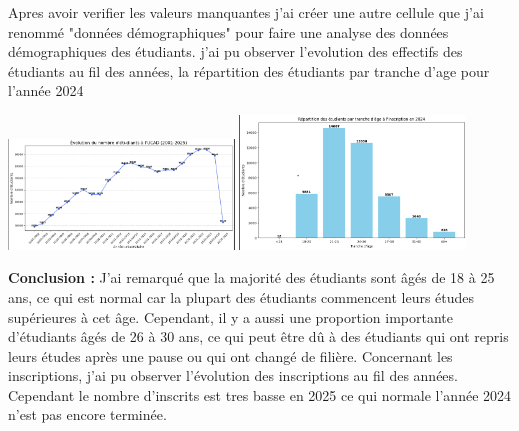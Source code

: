 Apres avoir verifier les valeurs manquantes j'ai créer une autre cellule que j'ai renommé "données démographiques"  pour faire une analyse des données démographiques des étudiants. 
j'ai pu observer l'evolution des effectifs des étudiants au fil des années, la répartition des étudiants par tranche d'age pour l'année 2024  
\begin{center}
    \centering
    \includegraphics[width=0.45\textwidth]{image/4.png}
    \hspace{0.05\textwidth}
    \includegraphics[width=0.45\textwidth]{image/5.png}
\end{center}

\textcolor{red}{\faInfoCircle}\textbf{Conclusion :}  J'ai remarqué que la majorité des étudiants sont âgés de 18 à 25 ans, ce qui est normal car la plupart des étudiants commencent leurs études supérieures à cet âge. Cependant, il y a aussi une proportion importante d'étudiants âgés de 26 à 30 ans, ce qui peut être dû à des étudiants qui ont repris leurs études après une pause ou qui ont changé de filière.
Concernant les inscriptions, j'ai pu observer l'évolution des inscriptions au fil des années. Cependant le nombre d'inscrits est tres basse en 2025 ce qui normale l'année 2024 n'est pas encore terminée. 

\vspace{0.5cm}  

